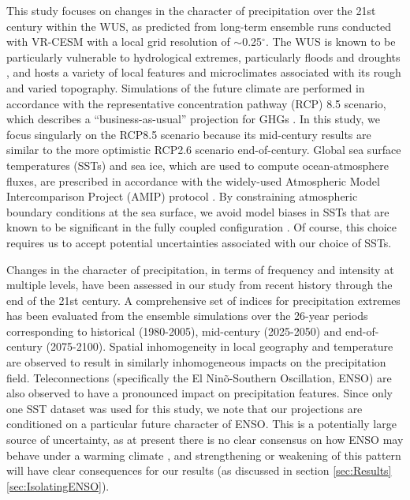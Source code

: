 \documentclass{ametsoc}
\begin{document}
This study focuses on changes in the character of precipitation over the 21st century within the WUS, as predicted from long-term ensemble runs conducted with VR-CESM with a local grid resolution of $\sim$0.25$^\circ$.  The WUS is known to be particularly vulnerable to hydrological extremes, particularly floods and droughts \citep{leung2003hydroclimate, caldwell2010california}, and hosts a variety of local features and microclimates associated with its rough and varied topography.  Simulations of the future climate are performed in accordance with the representative concentration pathway (RCP) 8.5 scenario, which describes a ``business-as-usual'' projection for GHGs \citep{riahi2011rcp}. In this study, we focus singularly on the RCP8.5 scenario because its mid-century results are similar to the more optimistic RCP2.6 scenario end-of-century. Global sea surface temperatures (SSTs) and sea ice, which are used to compute ocean-atmosphere fluxes, are prescribed in accordance with the widely-used Atmospheric Model Intercomparison Project (AMIP) protocol \citep{Gates1992}. By constraining atmospheric boundary conditions at the sea surface, we avoid model biases in SSTs that are known to be significant in the fully coupled configuration \citep{joseph2006enso, grodsky2012tropical, stevenson2012significant, jha2014sst, small2014new}.  Of course, this choice requires us to accept potential uncertainties associated with our choice of SSTs.


Changes in the character of precipitation, in terms of frequency and intensity at multiple levels, have been assessed in our study from recent history through the end of the 21st century.  A comprehensive set of indices for precipitation extremes has been evaluated from the ensemble simulations over the 26-year periods corresponding to historical (1980-2005), mid-century (2025-2050) and end-of-century (2075-2100). Spatial inhomogeneity in local geography and temperature are observed to result in similarly inhomogeneous impacts on the precipitation field.  Teleconnections (specifically the El Nin\~o-Southern Oscillation, ENSO) are also observed to have a pronounced impact on precipitation features.  Since only one SST dataset was used for this study, we note that our projections are conditioned on a particular future character of ENSO.  This is a potentially large source of uncertainty, as at present there is no clear consensus on how ENSO may behave under a warming climate \citep{fedorov2000nino, latif2009nino, guilyardi2009understanding, collins2010impact, dinezio2012mean}, and strengthening or weakening of this pattern will have clear consequences for our results (as discussed in section \ref{sec:Results}\ref{sec:IsolatingENSO}).
\end{document}
